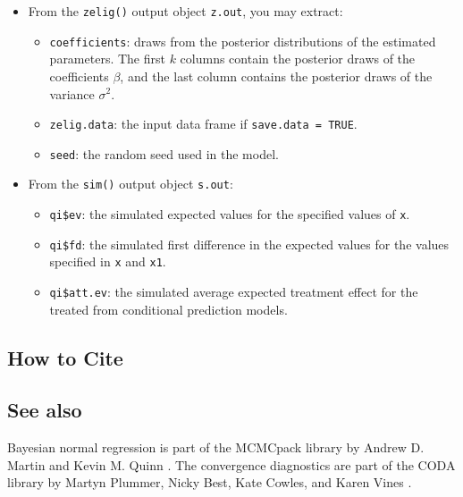 \begin{itemize}
\item From the \texttt{zelig()} output object \texttt{z.out}, you may extract:

\begin{itemize}
\item \texttt{coefficients}: draws from the posterior distributions
of the estimated parameters. The first $k$ columns contain the posterior draws
of the coefficients $\beta$, and the last column contains the posterior draws 
of the variance $\sigma^2$.

   \item {\tt zelig.data}: the input data frame if {\tt save.data = TRUE}.  
\item \texttt{seed}: the random seed used in the model.

\end{itemize}

\item From the \texttt{sim()} output object \texttt{s.out}:

\begin{itemize}
\item \texttt{qi\$ev}: the simulated expected values for the specified
values of \texttt{x}.

\item \texttt{qi\$fd}: the simulated first difference in the expected
values for the values specified in \texttt{x} and \texttt{x1}.

\item \texttt{qi\$att.ev}: the simulated average expected treatment effect
for the treated from conditional prediction models.

\end{itemize}
\end{itemize}

\subsection* {How to Cite} 



\subsection*{See also}
Bayesian normal regression is part of the MCMCpack library by Andrew D. Martin and Kevin M. Quinn \citep{MarQui05}. The convergence diagnostics are part of the CODA library by Martyn Plummer, Nicky Best, Kate Cowles, and Karen Vines \citep{PluBesCowVin05}.
